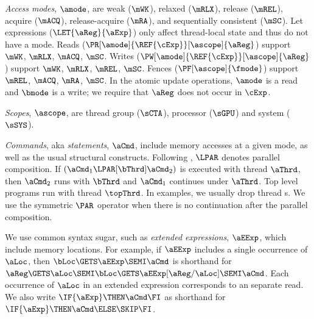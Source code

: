 \emph{Access modes}, $\amode$, are {weak} ($\mWK$), {relaxed} ($\mRLX$),
{release} ($\mREL$), {acquire} ($\mACQ$), {release-acquire} ($\mRA$), and
{sequentially consistent} ($\mSC$).
% 
Let expressions ($\LET{\aReg}{\aExp}$) only affect thread-local state and
thus do not have a mode.
% 
Reads ($\PR[\amode]{\REF{\cExp}}[\ascope]{\aReg}$) support
$\mWK$,
$\mRLX$,
$\mACQ$,
$\mSC$. 
Writes ($\PW[\amode]{\REF{\cExp}}[\ascope]{\aReg}$) support
$\mWK$,
$\mRLX$,
$\mREL$,
$\mSC$. 
Fences ($\PF[\ascope]{\fmode}$) support
$\mREL$,
$\mACQ$,
$\mRA$, 
$\mSC$.
% 
In the atomic update operations, $\amode$ is a read and $\bmode$ is a write;
we require that $\aReg$ does not occur in $\cExp$.

\emph{Scopes}, $\ascope$, are thread group ($\sCTA$), processor ($\sGPU$) and
system ($\sSYS$).

\emph{Commands}, aka \emph{statements}, $\aCmd$, include memory accesses at a
given mode, as well as the usual structural constructs.  Following
\cite{DBLP:conf/icfp/FerreiraHJ96}, $\LPAR$ denotes parallel composition.  If
$(\aCmd_1 \LPAR[\bThrd] \aCmd_2)$ is executed with thread \ID{} $\aThrd$, then
$\aCmd_2$ runs with \ID{} $\bThrd$ and $\aCmd_1$ continues under \ID{} $\aThrd$.
Top level programs run with thread \ID{} $\topThrd$.  In examples, we usually
drop thread \ID{}s.  We use the symmetric $\PAR$ operator when there is no
continuation after the parallel composition.

We use common syntax sugar, such as \emph{extended expressions}, $\aEExp$,
which include memory locations.  For example, if $\aEExp$ includes a single
occurrence of $\aLoc$, then $\bLoc\GETS\aEExp\SEMI \aCmd$ is shorthand for
$\aReg\GETS\aLoc\SEMI\bLoc\GETS\aEExp[\aReg/\aLoc]\SEMI \aCmd$.  Each
occurrence of $\aLoc$ in an extended expression corresponds to an separate
read.  We also write $\IF{\aExp} \THEN \aCmd \FI$ as shorthand for
$\IF{\aExp} \THEN \aCmd\ELSE \SKIP\FI$.



